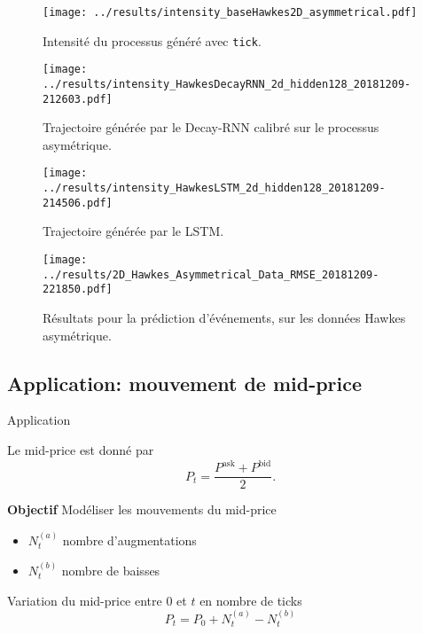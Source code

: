 \documentclass[../main.tex]{subfiles}
\begin{document}
\begin{frame}
\begin{figure}
	\texttt{[image: ../results/intensity\_baseHawkes2D\_asymmetrical.pdf]}
	\caption{Intensité du processus généré avec \texttt{tick}.}
\end{figure}
\end{frame}

\begin{frame}
\begin{figure}
	\texttt{[image: ../results/intensity\_HawkesDecayRNN\_2d\_hidden128\_20181209-212603.pdf]}
	\caption{Trajectoire générée par le Decay-RNN calibré sur le processus asymétrique.}	
\end{figure}
\end{frame}

\begin{frame}
\begin{figure}
	\texttt{[image: ../results/intensity\_HawkesLSTM\_2d\_hidden128\_20181209-214506.pdf]}
	\caption{Trajectoire générée par le LSTM.}
\end{figure}
\end{frame}

\begin{frame}
\begin{figure}
	\texttt{[image: ../results/2D\_Hawkes\_Asymmetrical\_Data\_RMSE\_20181209-221850.pdf]}
	\caption{Résultats pour la prédiction d'événements, sur les données Hawkes asymétrique.}
\end{figure}
\end{frame}

\subsection{Application: mouvement de mid-price}

\begin{frame}{Application}

Le mid-price est donné par
\begin{equation*}
	P_t = \frac{P^\text{ask} + P^\text{bid}}{2}.
\end{equation*}

\textbf{Objectif} Modéliser les mouvements du mid-price

\begin{itemize}
	\item $N_t^{(a)}$ nombre d'augmentations
	\item $N_t^{(b)}$ nombre de baisses
\end{itemize}

Variation du mid-price entre $0$ et $t$ en nombre de ticks \autocite{2015arXiv150204592B}
\begin{equation}
	P_t = P_0 + N_t^{(a)} - N_t^{(b)}
\end{equation}
\end{frame}
\end{document}
